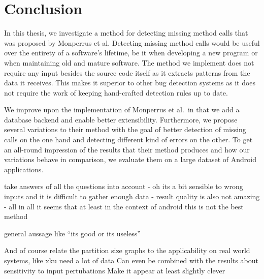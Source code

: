 \chapter{Conclusion}\label{ch:concl}

In this thesis, we investigate a method for detecting missing method calls that was proposed by Monperrus et al.
Detecting missing method calls would be useful over the entirety of a software's lifetime, be it when developing a new program or when maintaining old and mature software.
The method we implement does not require any input besides the source code itself as it extracts patterns from the data it receives.
This makes it superior to other bug detection systems as it does not require the work of keeping hand-crafted detection rules up to date.

We improve upon the implementation of Monperrus et al.\ in that we add a database backend and enable better extensibility.
Furthermore, we propose several variations to their method with the goal of better detection of missing calls on the one hand and detecting different kind of errors on the other.
To get an all-round impression of the results that their method produces and how our variations behave in comparison, we evaluate them on a large dataset of Android applications. 


take answers of all the questions into account - oh its a bit sensible to wrong inputs and it is difficult to gather enough data - result quality is also not amazing - all in all it seems that at least in the context of android this is not the best method

general aussage like ``its good or its useless''

	And of course relate the partition size graphs to the applicability on real world systems, like xku need a lot of data
	Can even be combined with the results about sensitivity to input pertubations
	Make it appear at least slightly clever


